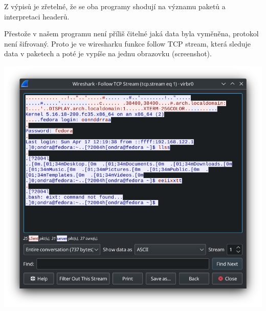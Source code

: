 \documentclass[12pt,a4paper]{article}
\begin{document}
Z výpisů je zřetelné, že se oba programy shodují na významu paketů a interpretaci headerů.
\newpage

Přestože v našem programu není příliš čitelné jaká data byla vyměněna, protokol není šifrovaný.
Proto je ve wiresharku funkce follow TCP stream, která sleduje data v paketech a poté je vypíše na jednu obrazovku (screenshot).

\begin{center}
\includegraphics[width=1\linewidth]{img/follow.png}
\end{center}
\newpage
\end{document}
